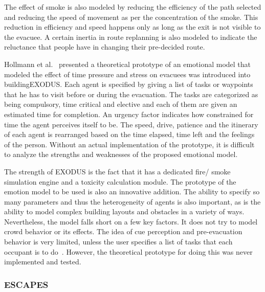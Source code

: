 The effect of smoke is also modeled by reducing the efficiency of the path selected and reducing the speed of movement as per the concentration of the smoke. This reduction in efficiency and speed happens only as long as the exit is not visible to the evacuee. A certain inertia in route replanning is also modeled to indicate the reluctance that people have in changing their pre-decided route.

Hollmann et al.~\cite{Hollmann:2010vy} presented a theoretical prototype of an emotional model that modeled the effect of time pressure and stress on evacuees was introduced into buildingEXODUS. Each agent is specified by giving a list of tasks or waypoints that he has to visit before or during the evacuation. The tasks are categorized as being compulsory, time critical and elective and each of them are given an estimated time for completion. An urgency factor indicates how constrained for time the agent perceives itself to be. The speed, drive, patience and the itinerary of each agent is rearranged based on the time elapsed, time left and the feelings of the person. Without an actual implementation of the prototype, it is difficult to analyze the strengths and weaknesses of the proposed emotional model.

The strength of EXODUS is the fact that it has a dedicated fire/ smoke simulation engine and a toxicity calculation module. The prototype of the emotion model to be used is also an innovative addition. The ability to specify so many parameters and thus the heterogeneity of agents is also important, as is the ability to model complex building layouts and obstacles in a variety of ways. Nevertheless, the model falls short on a few key factors. It does not try to model crowd behavior or its effects. The idea of cue perception and pre-evacuation behavior is very limited, unless the user specifies a list of tasks that each occupant is to do~\cite{Owen:1996jh}. However, the theoretical prototype for doing this was never implemented and tested.


\subsubsection{ESCAPES}

